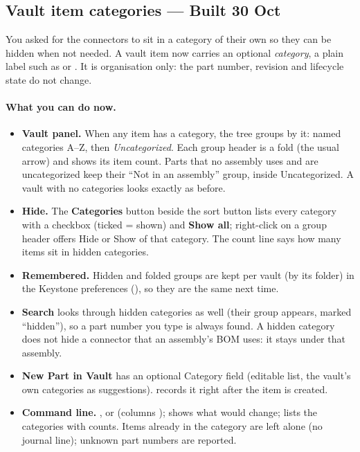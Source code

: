 \subsection{Vault item categories --- Built 30 Oct}\label{sec:categories-built}

You asked for the connectors to sit in a category of their own so they can be hidden when not needed. A vault item
now carries an optional \emph{category}, a plain label such as  or . It
is organisation only: the part number, revision and lifecycle state do not change.

\paragraph{What you can do now.}
\begin{itemize}[nosep]
  \item \textbf{Vault panel.} When any item has a category, the tree groups by it: named categories A--Z, then
        \emph{Uncategorized}. Each group header is a fold (the usual arrow) and shows its item count. Parts that no
        assembly uses and are uncategorized keep their ``Not in an assembly'' group, inside Uncategorized. A vault
        with no categories looks exactly as before.
  \item \textbf{Hide.} The \textbf{Categories} button beside the sort button lists every category with a checkbox
        (ticked = shown) and \textbf{Show all}; right-click on a group header offers Hide or Show of that
        category. The count line says how many items sit in hidden categories.
  \item \textbf{Remembered.} Hidden and folded groups are kept per vault (by its folder) in the Keystone
        preferences (), so they are the same next time.
  \item \textbf{Search} looks through hidden categories as well (their group appears, marked ``hidden''), so a part
        number you type is always found. A hidden category does not hide a connector that an assembly's BOM uses:
        it stays under that assembly.
  \item \textbf{New Part in Vault} has an optional Category field (editable list, the vault's own categories as
        suggestions).  records it right after the item is created.
  \item \textbf{Command line.} , or
         (columns );  shows what would change;
         lists the categories with counts. Items already in the category are left
        alone (no journal line); unknown part numbers are reported.
\end{itemize}

